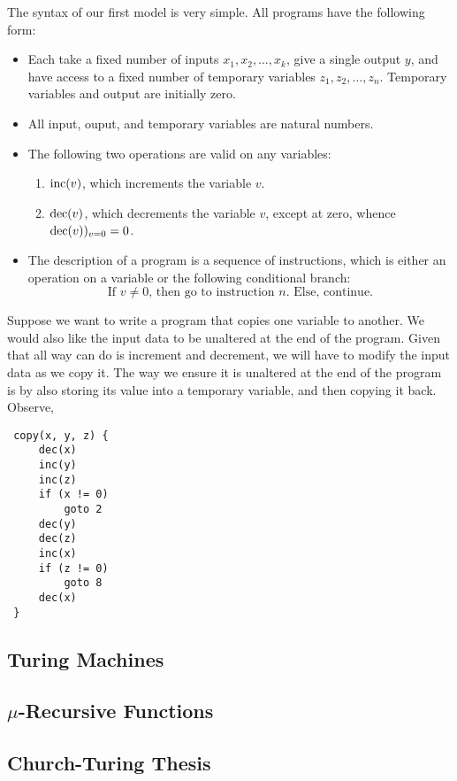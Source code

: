 \documentclass[english, 12pt]{article}
\begin{document}
  The syntax of our first model is very simple. All programs have the 
  following form: 
  \begin{itemize}
      \item Each take a fixed number of inputs $x_1, x_2, \dots, x_k$,
            give a single output $y$, and have access to a fixed number
            of temporary variables $z_1, z_2, \dots, z_n$. Temporary variables
            and output are initially zero.
      \item All input, ouput, and temporary variables are natural numbers.
      \item The following two operations are valid on any variables:
          \begin{enumerate}
              \item $\text{inc}(v)$, which increments the variable $v$.
              \item $\text{dec}(v)$, which decrements the variable $v$, except at zero, 
                whence $\text{dec}(v))_{v=0} = 0$.
          \end{enumerate}
      \item The description of a program is a sequence of instructions,
            which is either an operation on a variable or the following
            conditional branch:
            \[ \text{If } v \neq 0 \text{, then go to instruction } n
            \text{. Else, continue.} \]
  \end{itemize}
  Suppose we want to write a program that copies one variable to another. We would also like the
  input data to be unaltered at the end of the program. Given that all way can do is increment and 
  decrement, we will have to modify the input data as we copy it. The way we ensure it is unaltered
  at the end of the program is by also storing its value into a temporary variable, and then
  copying it back. Observe,
  \begin{lstlisting}
 copy(x, y, z) {
     dec(x)
     inc(y)
     inc(z)
     if (x != 0)
         goto 2
     dec(y)
     dec(z)
     inc(x)
     if (z != 0)
         goto 8
     dec(x)
 }
  \end{lstlisting}
  \subsection{Turing Machines}
  \subsection{$\mu$-Recursive Functions}
  \subsection{Church-Turing Thesis}
  
\end{document}
